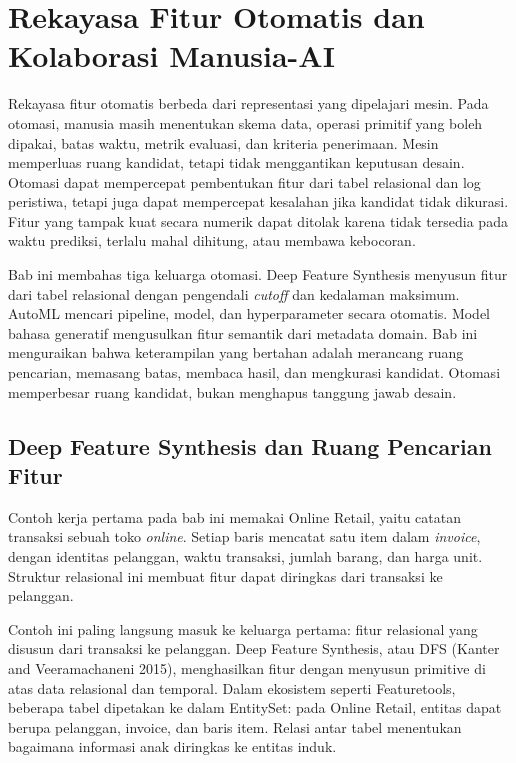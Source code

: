 \chapter{Rekayasa Fitur Otomatis dan Kolaborasi Manusia-AI}\label{rekayasa-fitur-otomatis-dan-kolaborasi-manusia-ai}

Rekayasa fitur otomatis berbeda dari representasi yang dipelajari mesin. Pada otomasi, manusia masih menentukan skema data, operasi primitif yang boleh dipakai, batas waktu, metrik evaluasi, dan kriteria penerimaan. Mesin memperluas ruang kandidat, tetapi tidak menggantikan keputusan desain. Otomasi dapat mempercepat pembentukan fitur dari tabel relasional dan log peristiwa, tetapi juga dapat mempercepat kesalahan jika kandidat tidak dikurasi. Fitur yang tampak kuat secara numerik dapat ditolak karena tidak tersedia pada waktu prediksi, terlalu mahal dihitung, atau membawa kebocoran.

Bab ini membahas tiga keluarga otomasi. Deep Feature Synthesis menyusun fitur dari tabel relasional dengan pengendali \emph{cutoff} dan kedalaman maksimum. AutoML mencari pipeline, model, dan hyperparameter secara otomatis. Model bahasa generatif mengusulkan fitur semantik dari metadata domain. Bab ini menguraikan bahwa keterampilan yang bertahan adalah merancang ruang pencarian, memasang batas, membaca hasil, dan mengkurasi kandidat. Otomasi memperbesar ruang kandidat, bukan menghapus tanggung jawab desain.

\section{Deep Feature Synthesis dan Ruang Pencarian Fitur}\label{deep-feature-synthesis-dan-ruang-pencarian-fitur}

Contoh kerja pertama pada bab ini memakai Online Retail, yaitu catatan transaksi sebuah toko \emph{online}. Setiap baris mencatat satu item dalam \emph{invoice}, dengan identitas pelanggan, waktu transaksi, jumlah barang, dan harga unit. Struktur relasional ini membuat fitur dapat diringkas dari transaksi ke pelanggan.

Contoh ini paling langsung masuk ke keluarga pertama: fitur relasional yang disusun dari transaksi ke pelanggan. Deep Feature Synthesis, atau DFS (Kanter and Veeramachaneni 2015), menghasilkan fitur dengan menyusun primitive di atas data relasional dan temporal. Dalam ekosistem seperti Featuretools, beberapa tabel dipetakan ke dalam EntitySet: pada Online Retail, entitas dapat berupa pelanggan, invoice, dan baris item. Relasi antar tabel menentukan bagaimana informasi anak diringkas ke entitas induk.

